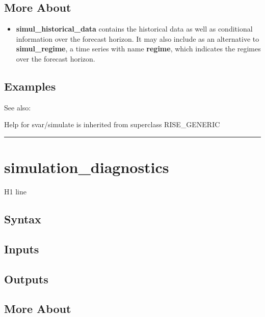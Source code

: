 \documentclass[letterpaper,10pt,english]{sphinxmanual}
\begin{document}
\subsection{More About}
\label{classes/models/@svar/svar:id119}\begin{itemize}
\item {} 
\textbf{simul\_historical\_data} contains the historical data as well as
conditional information over the forecast horizon. It may also include
as an alternative to \textbf{simul\_regime}, a time series with name
\textbf{regime}, which indicates the regimes over the forecast horizon.

\end{itemize}


\subsection{Examples}
\label{classes/models/@svar/svar:id120}
See also:

Help for svar/simulate is inherited from superclass RISE\_GENERIC


\bigskip\hrule{}\bigskip



\section{simulation\_diagnostics}
\label{classes/models/@svar/svar:simulation-diagnostics}\label{classes/models/@svar/svar:id121}
H1 line


\subsection{Syntax}
\label{classes/models/@svar/svar:id122}

\subsection{Inputs}
\label{classes/models/@svar/svar:id123}

\subsection{Outputs}
\label{classes/models/@svar/svar:id124}

\subsection{More About}
\label{classes/models/@svar/svar:id125}
\end{document}
